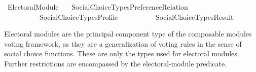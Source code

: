 %
\begin{isabellebody}%
%
%
\isadelimdocument
\isanewline
%
\endisadelimdocument
%
\isatagdocument
\isanewline
\isanewline
\isanewline
%
\isamarkuptrue%
%
\isamarkuptrue%
%
\endisatagdocument
{\isafolddocument}%
%
\isadelimdocument
%
\endisadelimdocument
%
\isadelimtheory
%
\endisadelimtheory
%
\isatagtheory
{}\isamarkupfalse%
\ Electoral{\isacharunderscore}{\kern0pt}Module\isanewline
\ \ \ {\isachardoublequoteopen}Social{\isacharunderscore}{\kern0pt}Choice{\isacharunderscore}{\kern0pt}Types{\isacharslash}{\kern0pt}Preference{\isacharunderscore}{\kern0pt}Relation{\isachardoublequoteclose}\isanewline
\ \ \ \ \ \ \ \ \ \ {\isachardoublequoteopen}Social{\isacharunderscore}{\kern0pt}Choice{\isacharunderscore}{\kern0pt}Types{\isacharslash}{\kern0pt}Profile{\isachardoublequoteclose}\isanewline
\ \ \ \ \ \ \ \ \ \ {\isachardoublequoteopen}Social{\isacharunderscore}{\kern0pt}Choice{\isacharunderscore}{\kern0pt}Types{\isacharslash}{\kern0pt}Result{\isachardoublequoteclose}\isanewline
{}%
\endisatagtheory
{\isafoldtheory}%
%
\isadelimtheory
%
\endisadelimtheory
%
\begin{isamarkuptext}%
Electoral modules are the principal component type of the composable modules
voting framework, as they are a generalization of voting rules in the sense of
social choice functions.
These are only the types used for electoral modules. Further restrictions are
encompassed by the electoral-module predicate.


\end{isamarkuptext}
\end{isabellebody}
